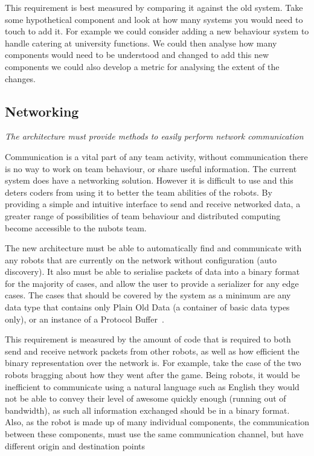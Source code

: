 \documentclass[english,12pt]{scrartcl}
\newcommand{\requirement}[1]{\textit{#1}}
\begin{document}
			This requirement is best measured by comparing it against the old system. Take some
			hypothetical component and look at how many systems you would need to touch to add it.
			For example we could consider adding a new behaviour system to handle catering at
			university functions. We could then analyse how many components would need to be
			understood and changed to add this new components we could also develop a metric for
			analysing the extent of the changes.


		\subsection{Networking}
			\requirement{The architecture must provide methods to easily perform network
			communication}

			Communication is a vital part of any team activity, without communication there is no
			way to work on team behaviour, or share useful information. The current system does have
			a networking solution. However it is difficult to use and this deters coders from using
			it to better the team abilities of the robots. By providing a simple and intuitive
			interface to send and receive networked data, a greater range of possibilities of team
			behaviour and distributed computing become accessible to the \gls{nubots} team.

			The new architecture must be able to automatically find and communicate with any robots
			that are currently on the network without configuration (auto discovery). It also must
			be able to serialise packets of data into a binary format for the majority of cases, and
			allow the user to provide a serializer for any edge cases. The cases that should be
			covered by the system as a minimum are any data type that contains only Plain Old Data
			(a container of basic data types only), or an instance of a
			Protocol Buffer~\cite{protobuf}.

			This requirement is measured by the amount of code that is required to both send and
			receive network packets from other robots, as well as how efficient the binary
			representation over the network is. For example, take the case of the two robots
			bragging about how they went after the game. Being robots, it would be inefficient to
			communicate using a natural language such as English they would not be able to convey
			their level of awesome quickly enough (running out of bandwidth), as such all
			information exchanged should be in a binary format. Also, as the robot is made up of
			many individual components, the communication between these components, must use the
			same communication channel, but have different origin and destination points
\end{document}
